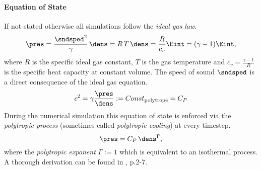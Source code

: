 \paragraph{Equation of State}
If not stated otherwise all simulations follow the \emph{ideal gas law}.
\begin{equation}
\pres = \frac{\sndsped^2}{\gamma} \, \dens = R\,T\,\dens = \frac{R}{c_v} \Eint = (\gamma - 1) \Eint,
\end{equation}
where $R$ is the specific ideal gas constant, $T$ is the gas temperature and $c_v
= \frac{\gamma - 1}{R}$ is the specific heat capacity at constant volume. The speed of sound $\sndsped$
is a direct consequence of the ideal gas equation.
\begin{equation}
c^2 = \gamma \frac{\pres}{\dens} := Const_{\text{polytrope}} = C_P
\end{equation}
During the numerical simulation this equation of state is enforced via the
\emph{polytropic process} (sometimes called \emph{polytropic cooling}) at
every timestep.
\begin{equation}
\pres = C_P \, \dens^\Gamma,
\end{equation}
where the \emph{polytropic exponent} $\Gamma := 1$ which is equivalent to an
isothermal process. A thorough derivation can be found in \cite{Horedt2004},
p.2-7.

